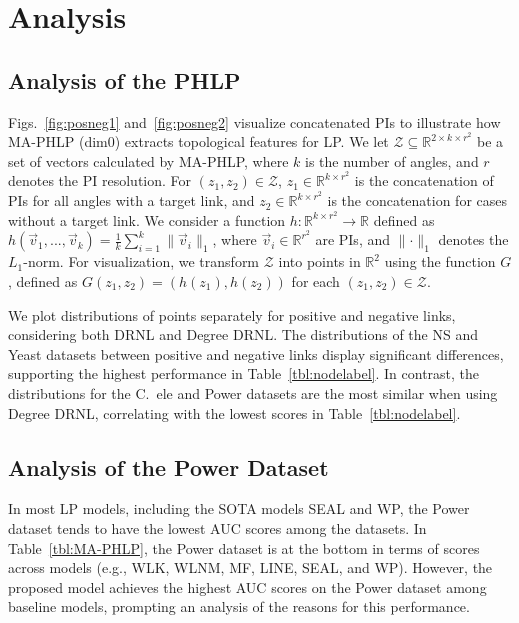 \section{Analysis}

\subsection{Analysis of the PHLP}

Figs.~\ref{fig:posneg1} and~\ref{fig:posneg2} visualize concatenated PIs to illustrate how MA-PHLP (dim0) extracts topological features for LP. 
We let $\mathcal{Z} \subseteq \mathbb{R}^{2 \times k \times r^2}$ be a set of vectors calculated by MA-PHLP, where $k$ is the number of angles, and $r$ denotes the PI resolution. 
For $(z_1, z_2) \in \mathcal{Z}$, $z_1 \in \mathbb{R}^{k \times r^2}$ is the concatenation of PIs for all angles with a target link, and $z_2 \in \mathbb{R}^{k \times r^2}$ is the concatenation for cases without a target link.
We consider a function $h:\mathbb{R}^{k \times r^2} \rightarrow \mathbb{R}$ defined as 
$h(\vec{v}_1, ..., \vec{v}_k) = \frac{1}{k}\sum_{i=1}^k \lVert \vec{v}_i \rVert_1$, where $\vec{v}_i \in \mathbb{R}^{r^2}$ are PIs, and $\lVert \cdot \rVert_1$ denotes the $L_1$-norm.
For visualization, we transform $\mathcal{Z}$ into points in $\mathbb{R}^2$ using the function $G$, defined as $G(z_1,z_2) = (h(z_1),h(z_2))$ for each $(z_1, z_2) \in \mathcal{Z}$. 

We plot distributions of points separately for positive and negative links, considering both DRNL and Degree DRNL.
The distributions of the NS and Yeast datasets between positive and negative links display significant differences, supporting the highest performance in Table~\ref{tbl:nodelabel}.
In contrast, the distributions for the C.~ele and Power datasets are the most similar when using Degree DRNL, correlating with the lowest scores in Table~\ref{tbl:nodelabel}.

\subsection{Analysis of the Power Dataset}
In most LP models, including the SOTA models SEAL and WP, the Power dataset tends to have the lowest AUC scores among the datasets. 
In Table~\ref{tbl:MA-PHLP}, the Power dataset is at the bottom in terms of scores across models (e.g., WLK, WLNM, MF, LINE, SEAL, and WP).
However, the proposed model achieves the highest AUC scores on the Power dataset among baseline models, prompting an analysis of the reasons for this performance.

